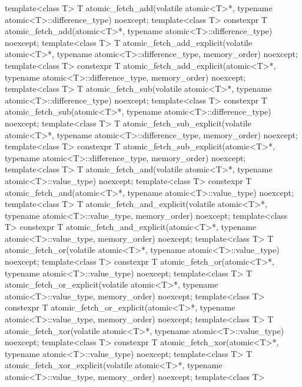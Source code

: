 \begin{codeblock}
{  template<class T>
    T atomic_fetch_add(volatile atomic<T>*, typename atomic<T>::difference_type) noexcept;
  template<class T>
    constexpr T atomic_fetch_add(atomic<T>*, typename atomic<T>::difference_type) noexcept;
  template<class T>
    T atomic_fetch_add_explicit(volatile atomic<T>*, typename atomic<T>::difference_type,
                                memory_order) noexcept;
  template<class T>
    constexpr T atomic_fetch_add_explicit(atomic<T>*, typename atomic<T>::difference_type,
                                          memory_order) noexcept;
  template<class T>
    T atomic_fetch_sub(volatile atomic<T>*, typename atomic<T>::difference_type) noexcept;
  template<class T>
    constexpr T atomic_fetch_sub(atomic<T>*, typename atomic<T>::difference_type) noexcept;
  template<class T>
    T atomic_fetch_sub_explicit(volatile atomic<T>*, typename atomic<T>::difference_type,
                                memory_order) noexcept;
  template<class T>
    constexpr T atomic_fetch_sub_explicit(atomic<T>*, typename atomic<T>::difference_type,
                                          memory_order) noexcept;
  template<class T>
    T atomic_fetch_and(volatile atomic<T>*, typename atomic<T>::value_type) noexcept;
  template<class T>
    constexpr T atomic_fetch_and(atomic<T>*, typename atomic<T>::value_type) noexcept;
  template<class T>
    T atomic_fetch_and_explicit(volatile atomic<T>*, typename atomic<T>::value_type,
                                memory_order) noexcept;
  template<class T>
    constexpr T atomic_fetch_and_explicit(atomic<T>*, typename atomic<T>::value_type,
                                          memory_order) noexcept;
  template<class T>
    T atomic_fetch_or(volatile atomic<T>*, typename atomic<T>::value_type) noexcept;
  template<class T>
    constexpr T atomic_fetch_or(atomic<T>*, typename atomic<T>::value_type) noexcept;
  template<class T>
    T atomic_fetch_or_explicit(volatile atomic<T>*, typename atomic<T>::value_type,
                               memory_order) noexcept;
  template<class T>
    constexpr T atomic_fetch_or_explicit(atomic<T>*, typename atomic<T>::value_type,
                                         memory_order) noexcept;
  template<class T>
    T atomic_fetch_xor(volatile atomic<T>*, typename atomic<T>::value_type) noexcept;
  template<class T>
    constexpr T atomic_fetch_xor(atomic<T>*, typename atomic<T>::value_type) noexcept;
  template<class T>
    T atomic_fetch_xor_explicit(volatile atomic<T>*, typename atomic<T>::value_type,
                                memory_order) noexcept;
  template<class T>
}
\end{codeblock}
